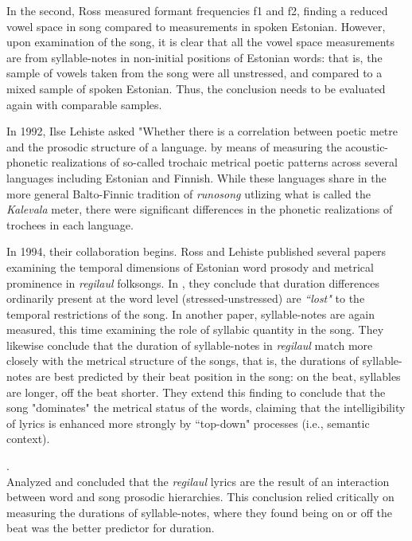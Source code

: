 In the second, Ross measured formant frequencies f1 and f2, finding a reduced vowel space in song compared to measurements in spoken Estonian. However, upon examination of the song, it is clear that all the vowel space measurements are from syllable-notes in non-initial positions of Estonian words: that is, the sample of vowels taken from  the song were all unstressed, and compared to a mixed sample of spoken Estonian. Thus, the conclusion needs to be evaluated again with comparable samples. 

%
In 1992, Ilse Lehiste asked "Whether there is a correlation between poetic metre and the prosodic structure of a language.\citep{lehiste1992} by means of measuring the acoustic-phonetic realizations of so-called trochaic metrical poetic patterns across several languages including Estonian and Finnish. While these languages share in the more general Balto-Finnic tradition of {\it runosong} utlizing what is called the {\it Kalevala} meter, there were significant differences in the phonetic realizations of trochees in each language. 


In 1994, their collaboration begins. Ross and Lehiste published several papers examining the temporal dimensions of Estonian word prosody and metrical prominence in {\it regilaul} folksongs. In \citep{rossLehiste1994}, they conclude that duration differences ordinarily present at the word level (stressed-unstressed) are {\it ``lost"} to the temporal restrictions of the song. In another paper, syllable-notes are again measured, this time examining the role of syllabic quantity in the song. They likewise conclude that the duration of syllable-notes in {\it regilaul} match more closely with the metrical structure of the songs, that is, the durations of syllable-notes are best predicted by their beat position in the song: on the beat, syllables are longer, off the beat shorter. They extend this finding to conclude that the song "dominates" the metrical status of the words, claiming that the intelligibility of lyrics is enhanced more strongly by ``top-down" processes (i.e., semantic context). 

\citep{rossLehiste1996}. \\

\citep{rossLehiste1998} Analyzed and concluded that the {\it regilaul} lyrics are the result of an interaction between word and song prosodic hierarchies. This conclusion relied critically on measuring the durations of syllable-notes, where they found being on or off the beat was the better predictor for duration. \\


